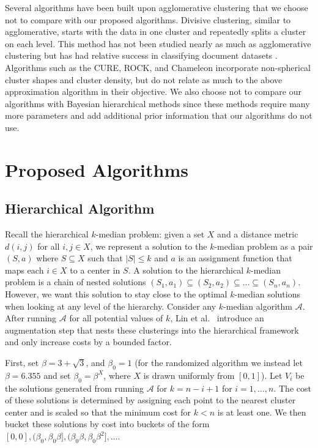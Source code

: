 \documentclass[conference, 10pt, final]{IEEEtran}
\begin{document}
Several algorithms have been built upon agglomerative clustering that we choose not to compare with our proposed algorithms. Divisive clustering, similar to agglomerative, starts with the data in one cluster and repeatedly splits a cluster on each level. This method has not been studied nearly as much as agglomerative clustering \cite{ESL} but has had relative success in classifying document datasets \cite{Zhao}.  Algorithms such as the CURE, ROCK, and Chameleon \cite{Guha_CURE, Guha_ROCK, Karypis} incorporate non-spherical cluster shapes and cluster density, but do not relate as much to the above approximation algorithm in their objective. We also choose not to compare our algorithms with Bayesian hierarchical methods since these methods require many more parameters and add additional prior information that our algorithms do not use. 

\section{Proposed Algorithms}

\subsection{Hierarchical Algorithm} 

Recall the hierarchical $k$-median problem: given a set $X$ and a distance metric $d(i,j)$ for all $i,j \in X$, we represent a solution to the $k$-median problem as a pair $(S, a)$ where $S \subseteq X$ such that $|S| \leq k$ and $a$ is an assignment function that maps each $i \in X$ to a center in $S$.
 A solution to the hierarchical $k$-median problem is a chain of nested solutions $(S_1, a_1) \subseteq (S_2, a_2) \subseteq \ldots \subseteq (S_n, a_n)$. However, we want this solution to stay close to the optimal $k$-median solutions when looking at any level of the hierarchy.  
Consider any $k$-median algorithm $\mathcal{A}$. After running $\mathcal{A}$ for all potential values of $k$, Lin et al.~\cite{Lin} introduce an augmentation step that nests these clusterings into the hierarchical framework and only increase costs by a bounded factor. 

First, set $\beta = 3+\sqrt{3}$, and $\beta_0 = 1$ (for the randomized algorithm we instead let $\beta = 6.355$ and set $\beta_0 = \beta^X$, where $X$ is drawn uniformly from $[0,1]$). Let $V_i$ be the solutions generated from running $\mathcal{A}$ for $k=n-i+1$ for $i=1, \ldots, n$. The cost of these solutions is determined by assigning each point to the nearest cluster center and is scaled so that the minimum cost for $k<n$ is at least one. We then bucket these solutions by cost into buckets of the form $[0,0], (\beta_0, \beta_0 \beta], (\beta_0 \beta, \beta_0 \beta^2], \ldots $. 
\end{document}

